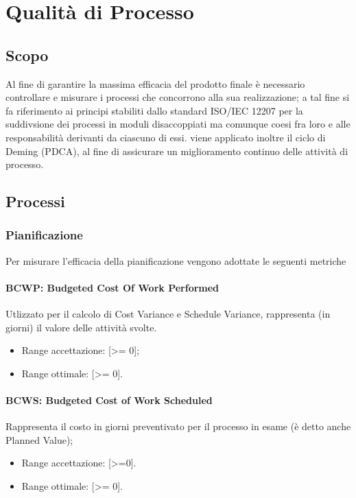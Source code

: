 \chapter{Qualità di Processo}
\label{processo} 
\section{Scopo}
Al fine di garantire la massima efficacia del prodotto finale è necessario controllare e misurare i processi che concorrono alla sua realizzazione; a tal fine si fa riferimento ai principi stabiliti dallo standard ISO/IEC 12207 per la suddivsione dei processi in moduli disaccoppiati ma comunque coesi fra loro e alle responsabilità derivanti da ciascuno di essi.
viene applicato inoltre il ciclo di Deming (PDCA), al fine di assicurare un miglioramento continuo delle attività di processo. 

\section{Processi}

\subsection{Pianificazione}
Per misurare l'efficacia della pianificazione vengono adottate le seguenti metriche 

\subsubsection{BCWP: Budgeted Cost Of Work Performed}\label{bcwp}
Utlizzato per il calcolo di Cost Variance e Schedule Variance, rappresenta (in giorni) il valore delle attività svolte.
\begin{itemize}
	\item Range accettazione: [>= 0];
	\item Range ottimale: [>= 0].
\end{itemize}
\subsubsection{BCWS: Budgeted Cost of Work Scheduled}\label{bcws}
Rappresenta il costo in giorni preventivato per il processo in esame (è detto anche Planned Value);
\begin{itemize}
\item Range accettazione: [>=0].
\item Range ottimale: [>= 0].
\end{itemize}

